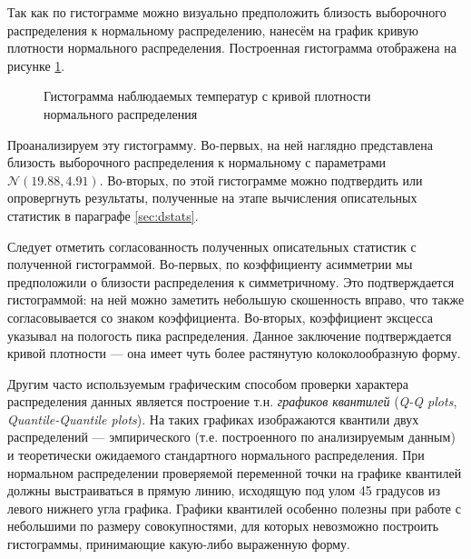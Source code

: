 Так как по гистограмме можно визуально предположить близость выборочного распределения к нормальному распределению, нанесём на график кривую плотности нормального распределения. Построенная гистограмма отображена на рисунке \ref{img:histogram_fitted}.
\begin{figure}[ht]
\caption{Гистограмма наблюдаемых температур с кривой плотности нормального распределения}
\label{img:histogram_fitted}
\end{figure}
Проанализируем эту гистограмму. Во-первых, на ней наглядно представлена близость выборочного распределения к нормальному с параметрами $\mathcal{N}(19.88, 4.91)$. Во-вторых, по этой гистограмме можно подтвердить или опровергнуть результаты, полученные на этапе вычисления описательных статистик в параграфе \ref{sec:dstats}.

Следует отметить согласованность полученных описательных статистик с полученной гистограммой. Во-первых, по коэффициенту асимметрии мы предположили о близости распределения к симметричному. Это подтверждается гистограммой: на ней можно заметить небольшую скошенность вправо, что также согласовывается со знаком коэффициента. Во-вторых, коэффициент эксцесса указывал на пологость пика распределения. Данное заключение подтверждается кривой плотности --- она имеет чуть более растянутую колоколообразную форму.

Другим часто используемым графическим способом проверки характера распределения данных является построение т.н. \textit{графиков квантилей} (\textit{Q-Q plots}, \textit{Quantile-Quantile plots}). На таких графиках изображаются квантили двух распределений --- эмпирического (т.е. построенного по анализируемым данным) и теоретически ожидаемого стандартного нормального распределения. При нормальном распределении проверяемой переменной точки на графике квантилей должны выстраиваться в прямую линию, исходящую под улом 45 градусов из левого нижнего угла графика. Графики квантилей особенно полезны при работе с небольшими по размеру совокупностями, для которых невозможно построить гистограммы, принимающие какую-либо выраженную форму.

